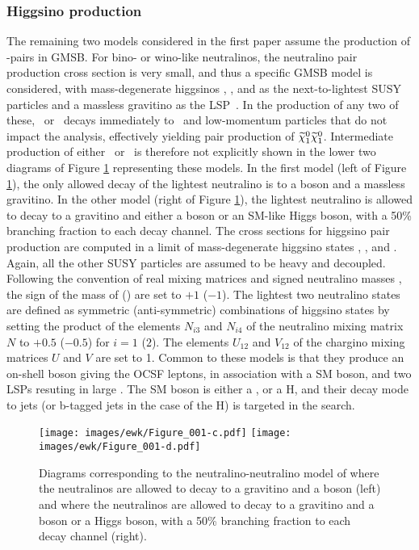 \subsubsection*{Higgsino production}
\noindent\justify
The remaining two models considered in the first paper assume the production of \firstchi-\firstchi pairs in GMSB.
For bino- or wino-like neutralinos, the neutralino pair production cross section is very small, and thus a specific GMSB model is considered, with mass-degenerate higgsinos \firstcharg, \secondchi, and \firstchi as the next-to-lightest SUSY particles and a massless gravitino as the LSP~\cite{Matchev:1999ft,Meade:2009qv,Ruderman}.
In the production of any two of these, \firstcharg\ or \secondchi\ decays immediately to \firstchi\ and low-momentum particles that do not impact the analysis, effectively yielding pair production of $\widetilde{\chi}^{0}_{1}\widetilde{\chi}^{0}_{1}$.
Intermediate production of either \firstcharg\ or \secondchi\ is therefore not explicitly shown in the lower two diagrams of Figure \ref{sig:feynmanHiggsino} representing these models.
In the first model (left of Figure \ref{sig:feynmanHiggsino}), the only allowed decay of the lightest neutralino is to a \PZ boson and a massless gravitino.
In the other model (right of Figure \ref{sig:feynmanHiggsino}), the lightest neutralino is allowed to decay to a gravitino and either a \PZ boson or an SM-like Higgs boson, with a 50\% branching fraction to each decay channel.
The cross sections for higgsino pair production are computed in a limit of mass-degenerate higgsino states \secondchi, \firstcharg, and \firstchi.
Again, all the other SUSY particles are assumed to be heavy and decoupled.
Following the convention of real mixing matrices and signed neutralino masses \cite{Skands:2003cj}, the sign of the mass of \firstchi (\secondchi) are set to $+1$ ($-1$).
The lightest two neutralino states are defined as symmetric (anti-symmetric) combinations of higgsino states by setting the product of the elements $N_{i3}$ and $N_{i4}$ of the neutralino mixing matrix $N$ to $+0.5$ ($-0.5$) for $i = 1$ ($2$).
The elements $U_{12}$ and $V_{12}$ of the chargino mixing matrices $U$ and $V$ are set to 1.
Common to these models is that they produce an on-shell \PZ boson giving the OCSF leptons, in association with a SM boson, and two LSPs resuting in large \ptmiss. 
The SM boson is either a \PW, \PZ or a H, and their decay mode to jets (or b-tagged jets in the case of the H) is targeted in the search.   
\begin{figure}[!htp]
\centering
\texttt{[image: images/ewk/Figure\_001-c.pdf]}
\texttt{[image: images/ewk/Figure\_001-d.pdf]}
\caption{Diagrams corresponding to the neutralino-neutralino model of where the neutralinos are allowed to decay to a gravitino and a \PZ boson (left) and where the neutralinos are allowed to decay to a gravitino and a \PZ boson or a Higgs boson, with a 50\% branching fraction to each decay channel (right).}
\label{sig:feynmanHiggsino}
\end{figure}                                                                                                                    
